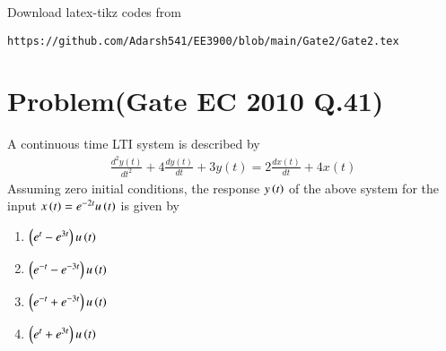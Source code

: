 \documentclass[journal,12pt,twocolumn]{IEEEtran}
\begin{document}
%
Download latex-tikz codes from 
%
\begin{lstlisting}
https://github.com/Adarsh541/EE3900/blob/main/Gate2/Gate2.tex
\end{lstlisting}
\section{Problem(Gate EC 2010 Q.41)}
A continuous time LTI system is described by
\begin{align}
    \frac{d^2y(t)}{dt^2}+4\frac{dy(t)}{dt}+3y(t) = 2\frac{dx(t)}{dt}+4x(t)\label{q}
\end{align}
Assuming zero initial conditions, the response $y\left(t\right)$ of the above system for the input $x\left(t\right)=e^{-2t}u\left(t\right)$ is given by
\begin{enumerate}
    \item $\left(e^t-e^{3t}\right)u\left(t\right)$
    \item $\left(e^{-t}-e^{-3t}\right)u\left(t\right)$
    \item $\left(e^{-t}+e^{-3t}\right)u\left(t\right)$
    \item $\left(e^{t}+e^{3t}\right)u\left(t\right)$
\end{enumerate}
\end{document}
